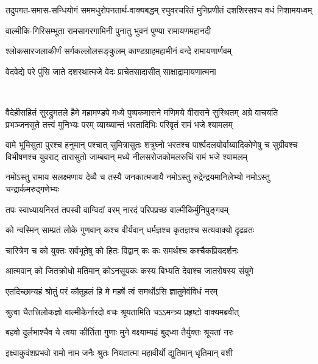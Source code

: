 \twolineshloka
{तदुपगत-समास-सन्धियोगं सममधुरोपनतार्थ-वाक्यबद्धम्}
{रघुवरचरितं मुनिप्रणीतं दशशिरसश्च वधं निशामयध्वम्}

\twolineshloka
{वाल्मीकि-गिरिसम्भूता रामसागरगामिनी}
{पुनातु भुवनं पुण्या रामायणमहानदी}

\twolineshloka
{श्लोकसारजलाकीर्णं सर्गकल्लोलसङ्कुलम्}
{काण्डग्राहमहामीनं वन्दे रामायणार्णवम्}

\twolineshloka
{वेदवेद्ये परे पुंसि जाते दशरथात्मजे}
{वेदः प्राचेतसादासीत् साक्षाद्रामायणात्मना}

\mbox{}\\
\resetShloka
{}

\fourlineindentedshloka
{वैदेहीसहितं सुरद्रुमतले हैमे महामण्डपे}
{मध्ये पुष्पकमासने मणिमये वीरासने सुस्थितम्}
{अग्रे वाचयति प्रभञ्जनसुते तत्त्वं मुनिभ्यः परम्}
{व्याख्यान्तं भरतादिभिः परिवृतं रामं भजे श्यामलम्}

\fourlineindentedshloka
{वामे भूमिसुता पुरश्च हनुमान् पश्चात् सुमित्रासुतः}
{शत्रुघ्नो भरतश्च पार्श्वदलयोर्वाय्वादिकोणेषु च}
{सुग्रीवश्च विभीषणश्च युवराट् तारासुतो जाम्बवान्}
{मध्ये नीलसरोजकोमलरुचिं रामं भजे श्यामलम्}

\twolineshloka
{नमोऽस्तु रामाय सलक्ष्मणाय देव्यै च तस्यै जनकात्मजायै}
{नमोऽस्तु रुद्रेन्द्रयमानिलेभ्यो नमोऽस्तु चन्द्रार्कमरुद्गणेभ्यः}

\clearpage
\resetShloka
{}

\twolineshloka
{तपः स्वाध्यायनिरतं तपस्वी वाग्विदां वरम्}
{नारदं परिपप्रच्छ वाल्मीकिर्मुनिपुङ्गवम्}%

\twolineshloka
{को न्वस्मिन् साम्प्रतं लोके गुणवान् कश्च वीर्यवान्}
{धर्मज्ञश्च कृतज्ञश्च सत्यवाक्यो दृढव्रतः}%

\twolineshloka
{चारित्रेण च को युक्तः सर्वभूतेषु को हितः}
{विद्वान् कः कः समर्थश्च कश्चैकप्रियदर्शनः}%

\twolineshloka
{आत्मवान् को जितक्रोधो मतिमान् कोऽनसूयकः}
{कस्य बिभ्यति देवाश्च जातरोषस्य संयुगे}%

\twolineshloka
{एतदिच्छाम्यहं श्रोतुं परं कौतूहलं हि मे}
{महर्षे त्वं समर्थोऽसि ज्ञातुमेवंविधं नरम्}%

\twolineshloka
{श्रुत्वा चैतत्त्रिलोकज्ञो वाल्मीकेर्नारदो वचः}
{श्रूयतामिति चऽऽमन्त्र्य प्रहृष्टो वाक्यमब्रवीत्}%

\twolineshloka
{बहवो दुर्लभाश्चैव ये त्वया कीर्तिता गुणाः}
{मुने वक्ष्याम्यहं बुद्‌ध्वा तैर्युक्तः श्रूयतां नरः}%

\twolineshloka
{इक्ष्वाकुवंशप्रभवो रामो नाम जनैः श्रुतः}
{नियतात्मा महावीर्यो द्युतिमान् धृतिमान् वशी}%

